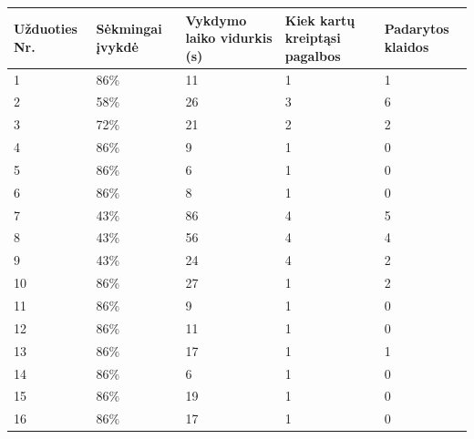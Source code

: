\documentclass[oneside]{VUMIFPSkursinis}
\begin{document}
\begin{center}
    \begin{tabular}{ |p{3cm}| p{3cm} |p{3cm}|p{3cm}|p{3cm}|}
\hline
Užduoties Nr.&Sėkmingai įvykdė&Vykdymo laiko vidurkis (s)&Kiek kartų kreiptąsi pagalbos&Padarytos klaidos\\ \hline
	1  &  86\% & 11 & 1 & 1 \\ \hline
	2  &  58\% & 26 & 3 & 6 \\ \hline
	3  &  72\% & 21 & 2 & 2 \\ \hline
	4  &  86\% &  9 & 1 & 0 \\ \hline
	5  &  86\% &  6 & 1 & 0 \\ \hline
	6  &  86\% &  8 & 1 & 0 \\ \hline
	7  &  43\% & 86 & 4 & 5 \\ \hline
	8  &  43\% & 56 & 4 & 4 \\ \hline
	9  &  43\% & 24 & 4 & 2 \\ \hline
	10 &  86\% & 27 & 1 & 2 \\ \hline
	11 &  86\% &  9 & 1 & 0 \\ \hline
	12 &  86\% & 11 & 1 & 0 \\ \hline
	13 &  86\% & 17 & 1 & 1 \\ \hline
	14 &  86\% &  6 & 1 & 0 \\ \hline
	15 &  86\% & 19 & 1 & 0 \\ \hline
	16 &  86\% & 17 & 1 & 0 \\ \hline
\end{tabular}
\end{center}
\end{document}
